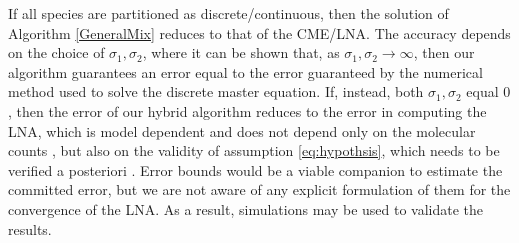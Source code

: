 \documentclass{llncs}
\begin{document}
If all species are partitioned as discrete/continuous, then the solution of Algorithm \ref{GeneralMix} reduces to that of the CME/LNA.
The accuracy depends on the choice of $\sigma_1,\sigma_2$, where it can be shown \cite{gillespie2008simulation} that, as $\sigma_1,\sigma_2 \rightarrow \infty$, then our algorithm guarantees an error equal to the error guaranteed by the numerical method used to solve the discrete master equation. 
If, instead, both $\sigma_1,\sigma_2$ equal $0$, then the error of our hybrid algorithm reduces to the error in computing the LNA, which is model dependent and does not depend only on the molecular counts \cite{ethier2009markov}, but also on the validity of assumption \eqref{eq:hypothsis}, which needs to be verified a posteriori \cite{goutsias2013markovian}. 
Error bounds would be a viable companion to estimate the committed error, but we are not aware of any explicit formulation of them for the convergence of the LNA. As a result, simulations may be used to validate the results.

\end{document}
